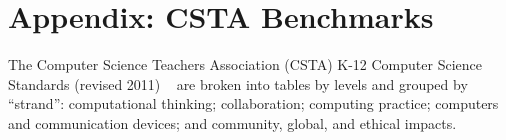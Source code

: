 \chapter{Appendix: CSTA Benchmarks} %

\label{AppendixCSTA} %

The Computer Science Teachers Association (CSTA) K-12 Computer Science Standards (revised 2011) ~\cite{csta} are broken into tables by levels and grouped by ``strand'': computational thinking; collaboration; computing practice; computers and communication devices; and community, global, and ethical impacts. \par 
